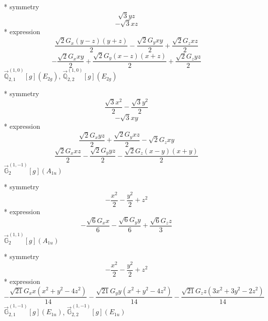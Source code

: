 \documentclass[fleqn,8pt]{jsarticle}
\begin{document}
\noindent\quad ** symmetry
\begin{dmath*}
\sqrt{3} y z
\end{dmath*}
\begin{dmath*}
- \sqrt{3} x z
\end{dmath*}
\noindent\quad ** expression
\begin{dmath*}
\frac{\sqrt{2} G_{x} \left(y - z\right) \left(y + z\right)}{2} - \frac{\sqrt{2} G_{y} x y}{2} + \frac{\sqrt{2} G_{z} x z}{2}
\end{dmath*}
\begin{dmath*}
- \frac{\sqrt{2} G_{x} x y}{2} + \frac{\sqrt{2} G_{y} \left(x - z\right) \left(x + z\right)}{2} + \frac{\sqrt{2} G_{z} y z}{2}
\end{dmath*}
\noindent\quad $\vec{\mathbb{Q}}_{2,1}^{(1,0)}[g](E_{2g})$, $\vec{\mathbb{Q}}_{2,2}^{(1,0)}[g](E_{2g})$

\noindent\quad ** symmetry
\begin{dmath*}
\frac{\sqrt{3} x^{2}}{2} - \frac{\sqrt{3} y^{2}}{2}
\end{dmath*}
\begin{dmath*}
- \sqrt{3} x y
\end{dmath*}
\noindent\quad ** expression
\begin{dmath*}
\frac{\sqrt{2} G_{x} y z}{2} + \frac{\sqrt{2} G_{y} x z}{2} - \sqrt{2} G_{z} x y
\end{dmath*}
\begin{dmath*}
\frac{\sqrt{2} G_{x} x z}{2} - \frac{\sqrt{2} G_{y} y z}{2} - \frac{\sqrt{2} G_{z} \left(x - y\right) \left(x + y\right)}{2}
\end{dmath*}
\noindent\quad $\vec{\mathbb{G}}_{2}^{(1,-1)}[g](A_{1u})$

\noindent\quad ** symmetry
\begin{dmath*}
- \frac{x^{2}}{2} - \frac{y^{2}}{2} + z^{2}
\end{dmath*}
\noindent\quad ** expression
\begin{dmath*}
- \frac{\sqrt{6} G_{x} x}{6} - \frac{\sqrt{6} G_{y} y}{6} + \frac{\sqrt{6} G_{z} z}{3}
\end{dmath*}
\noindent\quad $\vec{\mathbb{G}}_{2}^{(1,1)}[g](A_{1u})$

\noindent\quad ** symmetry
\begin{dmath*}
- \frac{x^{2}}{2} - \frac{y^{2}}{2} + z^{2}
\end{dmath*}
\noindent\quad ** expression
\begin{dmath*}
- \frac{\sqrt{21} G_{x} x \left(x^{2} + y^{2} - 4 z^{2}\right)}{14} - \frac{\sqrt{21} G_{y} y \left(x^{2} + y^{2} - 4 z^{2}\right)}{14} - \frac{\sqrt{21} G_{z} z \left(3 x^{2} + 3 y^{2} - 2 z^{2}\right)}{14}
\end{dmath*}
\noindent\quad $\vec{\mathbb{G}}_{2,1}^{(1,-1)}[g](E_{1u})$, $\vec{\mathbb{G}}_{2,2}^{(1,-1)}[g](E_{1u})$
\end{document}
